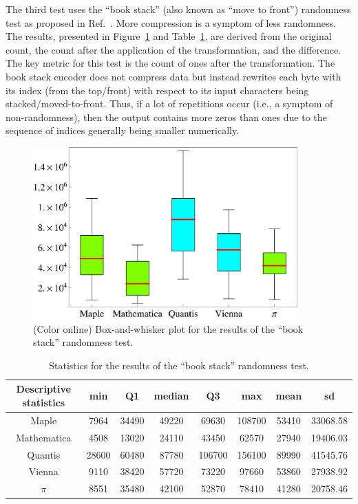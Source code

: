 \documentclass[10pt]{article}%
\begin{document}
The third test
uses  the ``book stack'' (also known as ``move to front'') randomness
test as proposed in Ref.~\cite{MR2099021,MR2162569}.
More compression is a symptom of less randomness.
The results, presented in
Figure~\ref{fig:example3} and Table~\ref{tab:3}, are derived from the original count, the count after the application
of the transformation, and the difference.  The key metric for this test is
the count of ones after the transformation.  The book stack encoder does
not compress data but instead rewrites each byte with its index (from
the top/front) with respect to its input characters being
stacked/moved-to-front.
Thus, if a lot of repetitions occur (i.e., a symptom of
non-randomness), then the output  contains more zeros than ones due to
the sequence of indices generally being smaller numerically.

\begin{figure}[htbp] %
   \centering
   \includegraphics[width=4in]{2009-QvPR-boxbookstack}
   \caption{(Color online) Box-and-whisker plot for the results of  the ``book stack'' randomness test.}
   \label{fig:example3}
\end{figure}

\begin{table}
\caption{Statistics for the results of  the ``book stack'' randomness
test.}\label{tab:3}
\begin{center}
\begin{tabular}
[c]{ c c c c c c c c }%
\hline\hline
Descriptive statistics & min & Q1 & median & Q3 & max & mean & sd\\\hline
Maple & 7964 & 34490 & 49220 & 69630 & 108700 & 53410 & 33068.58\\
Mathematica & 4508 & 13020 & 24110 & 43450 & 62570 & 27940 & 19406.03\\
Quantis & 28600 & 60480 & 87780 & 106700 & 156100 & 89990 & 41545.76\\
Vienna & 9110 & 38420 & 57720 & 73220 & 97660 & 53860 & 27938.92\\
$\pi$ & 8551 & 35480 & 42100 & 52870 & 78410 & 41280 & 20758.46\\\hline\hline
\end{tabular}
\end{center}
\end{table}
\end{document}
